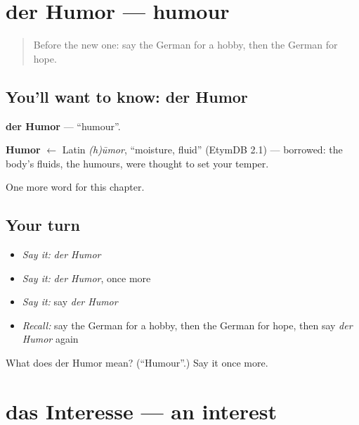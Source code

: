 \section[der Humor]{der Humor — humour}

\label{lesson:GE-C231-humor}



\begin{quote}
Before the new one: say the German for a hobby, then the German for hope.
\end{quote}

\subsection*{You'll want to know: der Humor}
\textbf{der Humor} — \textquotedblleft{}humour\textquotedblright{}.

\begin{cousinweb}
\textbf{Humor} $\leftarrow$ Latin \emph{(h)ūmor}, \textquotedblleft{}moisture, fluid\textquotedblright{} (EtymDB 2.1) — borrowed: the body's fluids, the humours, were thought to set your temper.
\end{cousinweb}

\begin{grammarlens}[title={What you've built}]
One more word for this chapter.
\end{grammarlens}

\subsection*{Your turn}
\begin{itemize}
\raggedright
  \item \emph{Say it:} \emph{der Humor}
  \item \emph{Say it:} \emph{der Humor}, once more
  \item \emph{Say it:} say \emph{der Humor}
  \item \emph{Recall:} say the German for a hobby, then the German for hope, then say \emph{der Humor} again
\end{itemize}

\begin{tcolorbox}[breakable,colback=teal!4,colframe=teal!35!black,title={Before you move on}]
What does der Humor mean? (\textquotedblleft{}Humour\textquotedblright{}.) Say it once more.
\end{tcolorbox}
\section[das Interesse]{das Interesse — an interest}

